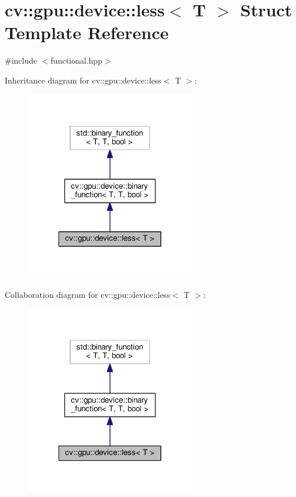 \hypertarget{structcv_1_1gpu_1_1device_1_1less}{\section{cv\-:\-:gpu\-:\-:device\-:\-:less$<$ T $>$ Struct Template Reference}
\label{structcv_1_1gpu_1_1device_1_1less}
}


{\ttfamily \#include $<$functional.\-hpp$>$}



Inheritance diagram for cv\-:\-:gpu\-:\-:device\-:\-:less$<$ T $>$\-:\nopagebreak
\begin{figure}[H]
\begin{center}
\leavevmode
\includegraphics[width=210pt]{structcv_1_1gpu_1_1device_1_1less__inherit__graph}
\end{center}
\end{figure}


Collaboration diagram for cv\-:\-:gpu\-:\-:device\-:\-:less$<$ T $>$\-:\nopagebreak
\begin{figure}[H]
\begin{center}
\leavevmode
\includegraphics[width=210pt]{structcv_1_1gpu_1_1device_1_1less__coll__graph}
\end{center}
\end{figure}
